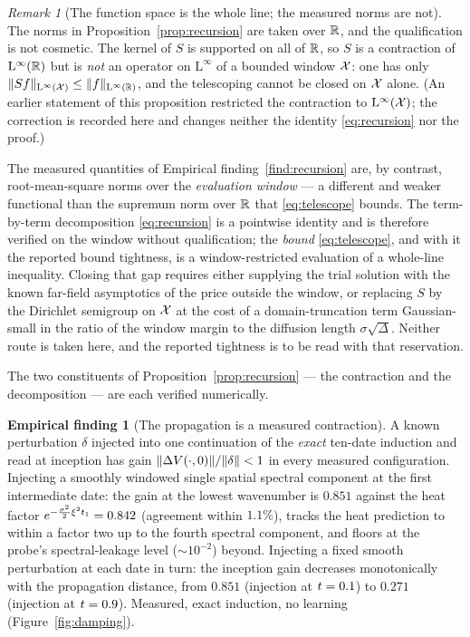 \documentclass[11pt]{article}
\newcommand{\heatSemigroup}{S}       %
\theoremstyle{plain}
\theoremstyle{definition}
\newtheorem{finding}[theorem]{Empirical finding}
\theoremstyle{remark}
\newtheorem{remark}[theorem]{Remark}
\begin{document}
\begin{remark}[The function space is the whole line; the measured norms are not]\label{rem:whole-line}
The norms in Proposition~\ref{prop:recursion} are taken over $\mathbb{R}$, and the
qualification is not cosmetic. The kernel of $\heatSemigroup$ is supported on all of
$\mathbb{R}$, so $\heatSemigroup$ is a contraction of $\mathrm{L}^{\infty}(\mathbb{R})$ but is
\emph{not} an operator on $\mathrm{L}^{\infty}$ of a bounded window $\mathcal{X}$:
one has only
$\norm{\heatSemigroup f}_{\mathrm{L}^{\infty}(\stateSpace)}
\le\norm{f}_{\mathrm{L}^{\infty}(\R)}$, and the telescoping cannot be closed on
$\mathcal{X}$ alone. (An earlier statement of this proposition restricted the
contraction to $\mathrm{L}^{\infty}(\mathcal{X})$; the correction is recorded here and
changes neither the identity \eqref{eq:recursion} nor the proof.)

The measured quantities of Empirical finding~\ref{find:recursion} are, by contrast,
root-mean-square norms over the \emph{evaluation window} --- a different and weaker
functional than the supremum norm over $\mathbb{R}$ that \eqref{eq:telescope} bounds. The
term-by-term decomposition \eqref{eq:recursion} is a pointwise identity and is
therefore verified on the window without qualification; the \emph{bound}
\eqref{eq:telescope}, and with it the reported bound tightness, is a
window-restricted evaluation of a whole-line inequality. Closing that gap requires
either supplying the trial solution with the known far-field asymptotics of the price
outside the window, or replacing $\heatSemigroup$ by the Dirichlet semigroup on
$\mathcal{X}$ at the cost of a domain-truncation term Gaussian-small in the ratio of
the window margin to the diffusion length $\sigma\sqrt{\Delta}$. Neither route is
taken here, and the reported tightness is to be read with that reservation.
\end{remark}

The two constituents of Proposition~\ref{prop:recursion} --- the contraction and
the decomposition --- are each verified numerically.

\begin{finding}[The propagation is a measured contraction]\label{find:damping}
A known perturbation $\delta$ injected into one continuation of the
\emph{exact} ten-date induction and read at inception has gain
$\lVert\Delta V(\cdot,0)\rVert/\lVert\delta\rVert<1$ in every measured
configuration. Injecting a smoothly windowed single spatial spectral component at the first
intermediate date: the gain at the lowest wavenumber is $0.851$ against the heat
factor $e^{-\frac{\sigma^{2}}{2}\xi^{2}t_{1}}=0.842$ (agreement
within $1.1\%$), tracks the heat prediction to within a factor two up to the
fourth spectral component, and floors at the probe's spectral-leakage level
($\sim10^{-2}$) beyond. Injecting a fixed smooth perturbation at each date in
turn: the inception gain decreases monotonically with the propagation distance,
from $0.851$ (injection at $t=0.1$) to $0.271$ (injection at
$t=0.9$). Measured, exact induction, no learning
(Figure~\ref{fig:damping}).
\end{finding}
\end{document}
